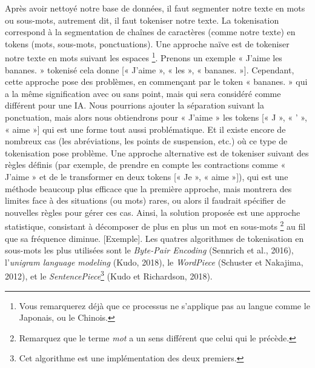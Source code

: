 \documentclass[12pt, french]{report}
\begin{document}
Après avoir nettoyé notre base de données, il faut segmenter notre texte en mots ou sous-mots, autrement dit, il faut tokeniser notre texte. La tokenisation correspond à la segmentation de  chaînes de caractères (comme notre texte) en tokens (mots, sous-mots, ponctuations).
Une approche naïve est de tokeniser notre texte en mots suivant les espaces
\footnote{Vous remarquerez déjà que ce processus ne s'applique pas au langue comme le Japonais, ou le Chinois.}. Prenons un exemple « J'aime les bananes. » tokenisé cela donne [« J'aime », « les », « bananes. »]. Cependant, cette approche pose des problèmes, en commençant par le token « bananes. » qui a la même signification avec ou sans point, mais qui sera considéré comme différent pour une IA. Nous pourrions ajouter la séparation suivant la ponctuation, mais alors nous obtiendrons pour « J'aime » les tokens [« J », « ' », « aime »] qui est une forme tout aussi problématique. Et il existe encore de nombreux cas (les abréviations, les points de suspension, etc.) où ce type de tokenisation pose problème. Une approche alternative est de tokeniser suivant des règles définis (par exemple, de prendre en compte les contractions comme « J'aime » et de le transformer en deux tokens [« Je », « aime »]), qui est une méthode beaucoup plus efficace que la première approche, mais montrera des limites face à des situations (ou mots) rares, ou alors il faudrait spécifier de nouvelles règles pour gérer ces cas. Ainsi, la solution proposée est une approche statistique, consistant à décomposer de plus en plus un mot en sous-mots \footnote{Remarquez que le terme \textit{mot} a un sens différent que celui qui le précède.} au fil que sa fréquence diminue. [Exemple]. Les quatres algorithmes de tokenisation en sous-mots les plus utilisées sont le \textit{Byte-Pair Encoding} (Sennrich et al., 2016), l'\textit{unigram language modeling} (Kudo, 2018), le \textit{WordPiece} (Schuster et Nakajima, 2012), et le \textit{SentencePiece}\footnote{Cet algorithme est une implémentation des deux premiers.} (Kudo et Richardson, 2018).\\
\end{document}

